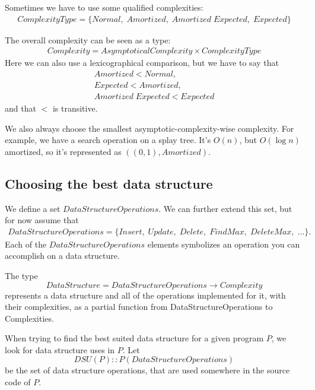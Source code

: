 \documentclass[11pt]{article}
\begin{document}
		Sometimes we have to use some qualified complexities:
		\begin{eqnarray}
			ComplexityType = \{ Normal, \; Amortized, \; Amortized \;Expected, \; Expected \}
		\end{eqnarray}

		The overall complexity can be seen as a type:
		\begin{eqnarray}
			Complexity = AsymptoticalComplexity \times ComplexityType
		\end{eqnarray}
		Here we can also use a lexicographical comparison, but we have to say that
		\begin{eqnarray}
			Amortized < Normal,\\
			Expected < Amortized,\\
			Amortized \; Expected < Expected
		\end{eqnarray}
		and that $<$ is transitive.

		We also always choose the smallest asymptotic-complexity-wise complexity.  For example, we have a search operation on a splay tree. It's $O(n)$,
		but $O(\log n)$ amortized, so it's represented as $((0,1),Amortized)$.
	\subsection{Choosing the best data structure}
		We define a set $DataStructureOperations$. We can further extend this set, but for now assume that
		\begin{eqnarray}
		  	DataStructureOperations = \{Insert, \; Update, \; Delete, \; FindMax,\; DeleteMax, \; \dots\}.
		\end{eqnarray}
		Each of the $DataStructureOperations$ elements symbolizes an operation you can accomplish on a data structure.

		The type
		\begin{equation}\label{data-structure-type}
			DataStructure = DataStructureOperations \rightarrow Complexity
		\end{equation}
		represents a data structure and all of the operations implemented for it, with their complexities, as a partial function from
		DataStructureOperations to Complexities.

		When trying to find the best suited data structure for a given program $P$, we look for data structure uses in $P$. Let
		\begin{equation}\label{dsu-type}
			DSU(P) :: P(DataStructureOperations)
		\end{equation} be the set of data structure operations, that are used somewhere in the source code of $P$.
\end{document}
